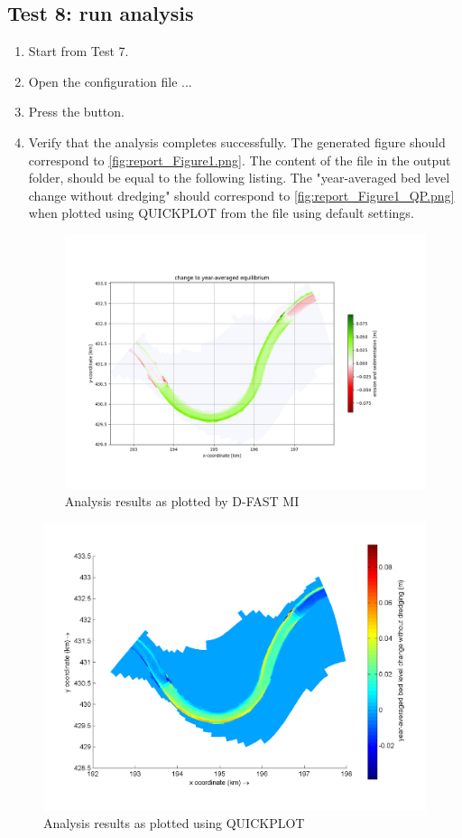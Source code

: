 \subsection{Test 8: run \dflowfm analysis}
\begin{enumerate}
\item Start from Test 7.
\item Open the configuration file ...
\item Press the  button.
\item Verify that the analysis completes successfully.
The generated figure should correspond to \autoref{fig:report_Figure1.png}.
The content of the  file in the output folder, should be equal to the following listing.
The "year-averaged bed level change without dredging" should correspond to \autoref{fig:report_Figure1_QP.png} when plotted using QUICKPLOT from the  file using default settings.
\begin{figure}[H]
\center
\includegraphics[width=12cm]{figures/report_Figure1.png}
\caption{Analysis results as plotted by D-FAST MI}
\label{fig:report_Figure1.png}
\end{figure}
\end{enumerate}


\begin{figure}[H]
\center
\includegraphics[width=12cm]{figures/report_Figure1_QP.png}
\caption{Analysis results as plotted using QUICKPLOT}
\label{fig:report_Figure1_QP.png}
\end{figure}

